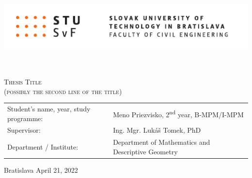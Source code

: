 \thispagestyle{empty}

\begin{center}%
	\includegraphics[height=2.8cm]{figures/STU-SvF-anfh}
\end{center}
\vspace{1cm}

\begin{flushright}
	\\
\end{flushright}
\vspace{3cm}

\begin{center}
	\textsc{\LARGE Thesis Title}\\
	\vspace{2pt}
	\textsc{\LARGE (possibly the second line of the title)}
\end{center}
\vfill

\noindent
\begin{tabular}{ll}
	Student's name, year, study programme: & Meno Priezvisko, 2\textsuperscript{nd} year, B-MPM/I-MPM\\
	Supervisor: & Ing. Mgr. Lukáš Tomek, PhD\\
	Department / Institute: & Department of Mathematics and Descriptive Geometry
\end{tabular}
\vspace{3cm}

\begin{center}
	\Large Bratislava April 21, 2022 %
\end{center}
\restoregeometry
\newpage

\

